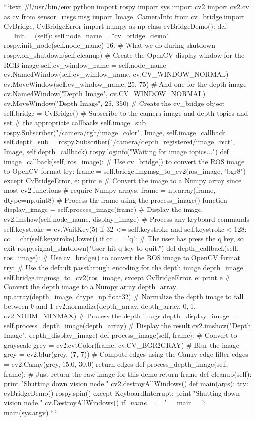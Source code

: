 ```text
#!/usr/bin/env python
import rospy
import sys
import cv2
import cv2.cv as cv
from sensor_msgs.msg import Image, CameraInfo
from cv_bridge import CvBridge, CvBridgeError
import numpy as np
class cvBridgeDemo():
def __init__(self):
self.node_name = "cv_bridge_demo"
rospy.init_node(self.node_name) 16.
# What we do during shutdown
rospy.on_shutdown(self.cleanup)
# Create the OpenCV display window for the RGB image
self.cv_window_name = self.node_name
cv.NamedWindow(self.cv_window_name, cv.CV_WINDOW_NORMAL)
cv.MoveWindow(self.cv_window_name, 25, 75)
# And one for the depth image
cv.NamedWindow("Depth Image", cv.CV_WINDOW_NORMAL)
cv.MoveWindow("Depth Image", 25, 350)
# Create the cv_bridge object
self.bridge = CvBridge()
# Subscribe to the camera image and depth topics and set
# the appropriate callbacks
self.image_sub = rospy.Subscriber("/camera/rgb/image_color",
Image, self.image_callback
self.depth_sub =
rospy.Subscriber("/camera/depth_registered/image_rect",
Image, self.depth_callback) rospy.loginfo("Waiting for image topics...")
def image_callback(self, ros_image):
# Use cv_bridge() to convert the ROS image to OpenCV format try:
frame = self.bridge.imgmsg_to_cv2(ros_image, "bgr8") except CvBridgeError, e:
print e
# Convert the image to a Numpy array since most cv2 functions # require Numpy arrays.
frame = np.array(frame, dtype=np.uint8)
    # Process the frame using the process_image() function
display_image = self.process_image(frame) # Display the image.
cv2.imshow(self.node_name, display_image)
    # Process any keyboard commands
self.keystroke = cv.WaitKey(5)
if 32 <= self.keystroke and self.keystroke < 128:
cc = chr(self.keystroke).lower()
if cc == 'q':
# The user has press the q key, so exit rospy.signal_shutdown("User hit q key to quit.")
def depth_callback(self, ros_image):
# Use cv_bridge() to convert the ROS image to OpenCV format try:
            # Use the default passthrough encoding for the depth image
depth_image = self.bridge.imgmsg_to_cv2(ros_image, except CvBridgeError, e:
            print e
        # Convert the depth image to a Numpy array
depth_array = np.array(depth_image, dtype=np.float32)
        # Normalize the depth image to fall between 0 and 1
cv2.normalize(depth_array, depth_array, 0, 1, cv2.NORM_MINMAX) # Process the depth image
depth_display_image = self.process_depth_image(depth_array) # Display the result
cv2.imshow("Depth Image", depth_display_image)
def process_image(self, frame):
# Convert to grayscale
grey = cv2.cvtColor(frame, cv.CV_BGR2GRAY)
        # Blur the image
grey = cv2.blur(grey, (7, 7))
# Compute edges using the Canny edge filter
edges = cv2.Canny(grey, 15.0, 30.0)
return edges
def process_depth_image(self, frame):
# Just return the raw image for this demo return frame
def cleanup(self):
print "Shutting down vision node." cv2.destroyAllWindows()
def main(args): try:
        cvBridgeDemo()
rospy.spin()
except KeyboardInterrupt:
print "Shutting down vision node." cv.DestroyAllWindows()
if\textit{_name_}== '__main__': main(sys.argv)
```

